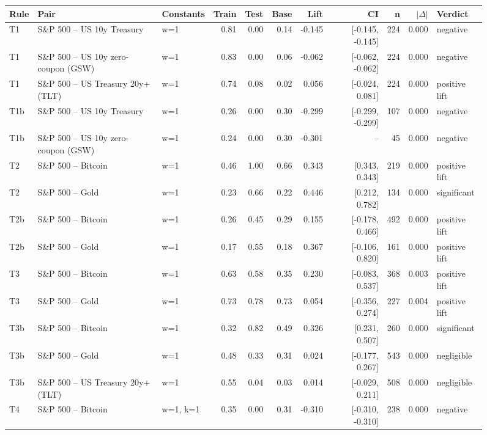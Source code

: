 \begin{figure}
\centering
\begin{tabular}{lllrrrrrrrl}
\toprule
Rule & Pair & Constants & Train & Test & Base & Lift & CI & n & $|\Delta|$ & Verdict \\
\midrule
T1 & S\&P 500 -- US 10y Treasury & w=1 & 0.81 & 0.00 & 0.14 & -0.145 & [-0.145, -0.145] & 224 & 0.000 & negative \\
T1 & S\&P 500 -- US 10y zero-coupon (GSW) & w=1 & 0.83 & 0.00 & 0.06 & -0.062 & [-0.062, -0.062] & 224 & 0.000 & negative \\
T1 & S\&P 500 -- US Treasury 20y+ (TLT) & w=1 & 0.74 & 0.08 & 0.02 & 0.056 & [-0.024, 0.081] & 224 & 0.000 & positive lift \\
T1b & S\&P 500 -- US 10y Treasury & w=1 & 0.26 & 0.00 & 0.30 & -0.299 & [-0.299, -0.299] & 107 & 0.000 & negative \\
T1b & S\&P 500 -- US 10y zero-coupon (GSW) & w=1 & 0.24 & 0.00 & 0.30 & -0.301 & -- & 45 & 0.000 & negative \\
T2 & S\&P 500 -- Bitcoin & w=1 & 0.46 & 1.00 & 0.66 & 0.343 & [0.343, 0.343] & 219 & 0.000 & positive lift \\
T2 & S\&P 500 -- Gold & w=1 & 0.23 & 0.66 & 0.22 & 0.446 & [0.212, 0.782] & 134 & 0.000 & significant \\
T2b & S\&P 500 -- Bitcoin & w=1 & 0.26 & 0.45 & 0.29 & 0.155 & [-0.178, 0.466] & 492 & 0.000 & positive lift \\
T2b & S\&P 500 -- Gold & w=1 & 0.17 & 0.55 & 0.18 & 0.367 & [-0.106, 0.820] & 161 & 0.000 & positive lift \\
T3 & S\&P 500 -- Bitcoin & w=1 & 0.63 & 0.58 & 0.35 & 0.230 & [-0.083, 0.537] & 368 & 0.003 & positive lift \\
T3 & S\&P 500 -- Gold & w=1 & 0.73 & 0.78 & 0.73 & 0.054 & [-0.356, 0.274] & 227 & 0.004 & positive lift \\
T3b & S\&P 500 -- Bitcoin & w=1 & 0.32 & 0.82 & 0.49 & 0.326 & [0.231, 0.507] & 260 & 0.000 & significant \\
T3b & S\&P 500 -- Gold & w=1 & 0.48 & 0.33 & 0.31 & 0.024 & [-0.177, 0.267] & 543 & 0.000 & negligible \\
T3b & S\&P 500 -- US Treasury 20y+ (TLT) & w=1 & 0.55 & 0.04 & 0.03 & 0.014 & [-0.029, 0.211] & 508 & 0.000 & negligible \\
T4 & S\&P 500 -- Bitcoin & w=1, k=1 & 0.35 & 0.00 & 0.31 & -0.310 & [-0.310, -0.310] & 238 & 0.000 & negative \\

\end{tabular}
\end{figure}
